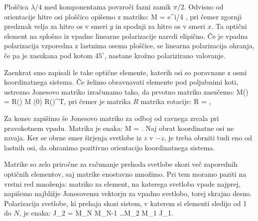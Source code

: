 Ploščica $\lambda/4$ med komponentama povzroči fazni zamik $\pi/2$. Odvisno od
orientacije hitre osi ploščico opišemo z matriko:
\beq
M = e^{\pm i\pi/4}
\left[\begin{array}{cc}
1 & 0 \\
0 & \mp i\\
\end{array}\right]\!\!,
\label{eq:03_56}
\eeq
pri čemer zgornji predznak velja za hitro os v smeri $y$ in spodnji 
za hitro os v smeri $x$. Ta optični element na splošno iz vpadne linearne
polarizacije naredi elipično. Če je vpadna polarizacija vzporedna z
lastnima osema ploščice, se linearna polarizacija ohranja, če pa je
zasukana pod kotom $45^\circ$, nastane krožno polarizirano valovanje. 

Zaenkrat smo zapisali le take optične elemente, katerih osi so poravnane z osmi
koordinatnega sistema. Če želimo obravnavati elemente pod poljubnimi koti, 
ustrezno Jonesovo matriko izračunamo tako, da prvotno matriko zasučemo:
\beq
M(\vartheta) = R(\vartheta) \cdot M (0) R(\vartheta)^{T},
\label{eq:03_57}
\eeq
pri čemer je matrika $R$ matrika rotacije:
\beq
R = \!\!,
\label{eq:03_58}
\eeq

Za konec zapišimo še Jonesovo matriko za odboj od ravnega zrcala pri
pravokotnem vpadu. Matrika je enaka:
\beq
M = \left[\begin{array}{cc}
1 & 0 \\
0 & -1\\
\end{array}\right]\!\!.
\label{eq:03_59}
\eeq
Naj obrat koordinatne osi ne zavaja. Ker se obrne smer 
širjenja svetlobe iz $z$ v $-z$, je treba obrniti tudi eno od lastnih osi, 
da ohranimo pozitivno orientacijo koordinatnega sistema. 

Matrike so zelo priročne za računanje prehoda svetlobe skozi več
zaporednih optičnih elementov, saj matrike enostavno množimo. Pri tem 
moramo paziti na vrstni red množenja: matriko za element, na katerega
svetloba vpade najprej, napišemo najbližje Jonesovemu vektorju za vpadno svetlobo, 
torej skrajno desno. Polarizacija svetlobe, ki prehaja skozi sistem, 
v katerem si elementi sledijo od 1 do $N$, je enaka:
\beq
J_2 = M_N \cdot M_{N-1} \dots M_2 \cdot M_1 \cdot J_1.
\label{eq:03_60}
\eeq

